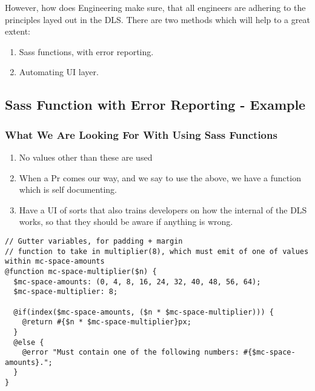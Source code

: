 However, how does Engineering make sure, that all engineers are adhering to the
principles layed out in the DLS. There are two methods which will help to a
great extent:
\begin{enumerate}
  \item Sass functions, with error reporting.
  \item Automating UI layer.
\end{enumerate}

\subsection{ Sass Function with Error Reporting - Example }

\subsubsection{ What We Are Looking For With Using Sass Functions }
\begin{enumerate}
  \item No values other than these are used
  \item When a Pr comes our way, and we say to use the above, we have a function which is self documenting.
  \item Have a UI of sorts that also trains developers on how the internal of
  the DLS works, so that they should be aware if anything is wrong.
\end{enumerate}

\begin{lstlisting}
// Gutter variables, for padding + margin
// function to take in multiplier(8), which must emit of one of values within mc-space-amounts
@function mc-space-multiplier($n) {
  $mc-space-amounts: (0, 4, 8, 16, 24, 32, 40, 48, 56, 64);
  $mc-space-multiplier: 8;

  @if(index($mc-space-amounts, ($n * $mc-space-multiplier))) {
    @return #{$n * $mc-space-multiplier}px;
  }
  @else {
    @error "Must contain one of the following numbers: #{$mc-space-amounts}.";
  }
}
\end{lstlisting}
